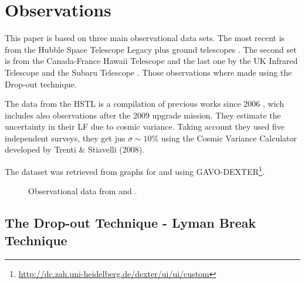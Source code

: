 \section{Observations}

This paper is based on three main observational data sets. The most recent is
from the Hubble Space Telescope Legacy plus ground telescopes \citep{bouwens14}.
The second set is from the Canada-France Hawaii Telescope\citep{willott13} and
the last one by the UK Infrared Telescope and the Subaru Telescope
\cite{mclure09}. Those observations where made using the Drop-out technique.

The data from the HSTL is a compilation of previous works since
2006 \citep{bouwens06}, wich includes also observations after the 2009
upgrade mission\citep{bouwens12}. They estimate the uncertainty in their LF due
to cosmic variance. Taking account they used five independent surveys, they get
jus $\sigma\sim 10\%$\citep{bouwens14} using the Cosmic Variance Calculator
developed by Trenti \& Stiavelli (2008).



The dataset was retrieved from graphs for \cite{bouwens14} and \cite{mclure09} 
using
GAVO-DEXTER\footnote{\url{http://dc.zah.uni-heidelberg.de/dexter/ui/ui/custom}}.



\begin{figure}
\caption{Observational data from \cite{bouwens14,mclure09}and \cite{willott13}.}
\label{graph_observational_data}
\end{figure}

     
\subsection{The Drop-out Technique - Lyman Break Technique}

\cite{steidel03}